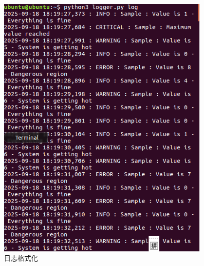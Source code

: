 \documentclass[UTF8]{ctexart}
\begin{document}
\begin{enumerate}
\begin{figure}[H]
    \includegraphics[width=0.95\textwidth]{picture/2.png}
    \caption{日志格式化}
\end{figure}
    

\end{enumerate}
\end{document}
